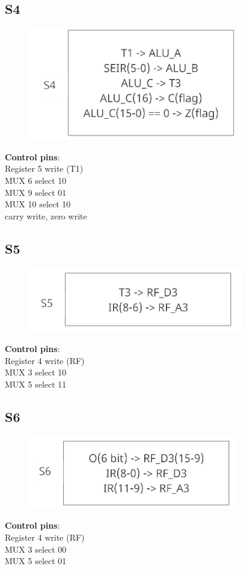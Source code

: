 \documentclass[11pt, fleqn]{article}
\begin{document}
\subsection*{S4}
\begin{figure}[H]
    \centering
    \includegraphics{DataPath/DataPath_S4.PNG}
\end{figure}
\textbf{Control pins}: \\
Register 5 write (T1) \\
MUX 6 select 10 \\
MUX 9 select 01 \\
MUX 10 select 10 \\
carry write, zero write \\

\subsection*{S5}
\begin{figure}[H]
    \centering
    \includegraphics{DataPath/DataPath_S5.PNG}
\end{figure}
\textbf{Control pins}: \\
Register 4 write (RF) \\
MUX 3 select 10 \\
MUX 5 select 11 \\

\subsection*{S6}
\begin{figure}[H]
    \centering
    \includegraphics{DataPath/DataPath_S6.PNG}
\end{figure}
\textbf{Control pins}: \\
Register 4 write (RF) \\
MUX 3 select 00 \\
MUX 5 select 01 \\
\end{document}
